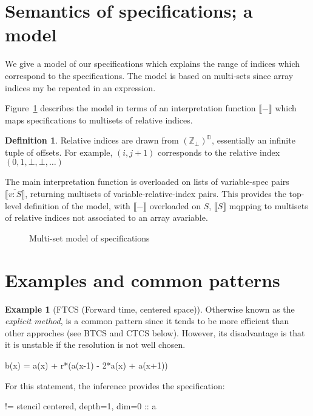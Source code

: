 \documentclass[9pt]{sigplanconf}
\newcounter{block}
\theoremstyle{definition}
\newtheorem{example}[block]{Example}
\newtheorem{definition}[block]{Definition}
\newcommand{\interp}[1]{\llbracket{#1}\rrbracket}
\begin{document}
\section{Semantics of specifications; a model}
\label{sec:semantics}

\newcommand{\relix}{(\mathbb{Z}_\bot)^\mathbb{D}}

We give a model of our specifications which explains
the range of indices which correspond to the specifications.
The model is based on multi-sets since array indices my be repeated
in an expression.

Figure~\ref{fig:model} describes the model in terms of
an interpretation function $\interp{-}$ which maps specifications
to multisets of relative indices.

\begin{definition}Relative indices are drawn
from $(\mathbb{Z}_{\bot})^{\mathbb{D}}$, essentially an infinite
tuple of offsets. For example, $(i, j+1)$ corresponds to
the relative index $(0, 1, \bot, \bot, \ldots)$
\end{definition}

The main interpretation function is overloaded on lists of
variable-spec pairs $\interp{\overline{v : S}}$,
returning multisets of variable-relative-index pairs. This provides
the top-level definition of the model, with $\interp{-}$ overloaded
on $S$, $\interp{S}$ mqpping to multisets of
relative indices not associated to an array avariable.

\begin{figure}

\caption{Multi-set model of specifications}
\label{fig:model}
\end{figure}


\section{Examples and common patterns}


\begin{example}[FTCS (Forward time, centered space)]

  Otherwise known as the \emph{explicit method}, is a common
  pattern since it tends to be more efficient than other approches
  (see BTCS and CTCS below). However, its disadvantage is that it is
  unstable if the resolution is not well chosen.

\begin{ExmVerbatim}
b(x) = a(x) + r*(a(x-1) - 2*a(x) + a(x+1))
\end{ExmVerbatim}
%
For this statement, the inference provides the specification:
%
\begin{SpecVerbatim}
!=  stencil centered, depth=1, dim=0 :: a
\end{SpecVerbatim}



\end{example}
\end{document}
